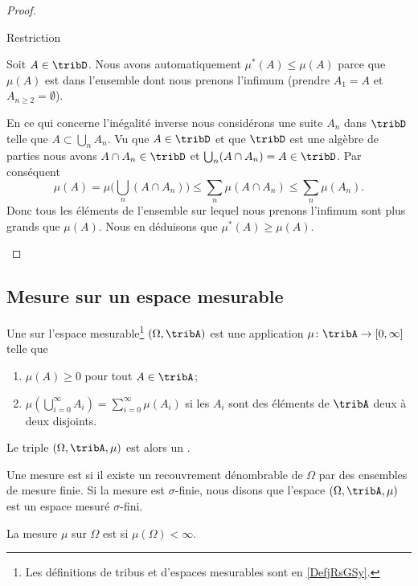 \begin{proof}
\begin{subproof}
    \item[Restriction]

        Soit \( A\in\tribD\). Nous avons automatiquement \( \mu^*(A)\leq \mu(A)\) parce que \( \mu(A)\) est dans l'ensemble dont nous prenons l'infimum (prendre \( A_1=A\) et \( A_{n\geq 2}=\emptyset\)).

        En ce qui concerne l'inégalité inverse nous considérons une suite \( A_n\) dans \( \tribD\) telle que \( A\subset\bigcup_nA_n\). Vu que \( A\in\tribD\) et que \( \tribD\) est une algèbre de parties nous avons \( A\cap A_n\in \tribD\) et \( \bigcup_n(A\cap A_n)=A\in\tribD\). Par conséquent
        \begin{equation}
            \mu(A)=\mu\big( \bigcup_n(A\cap A_n) \big)\leq \sum_n\mu(A\cap A_n)\leq \sum_n\mu(A_n).
        \end{equation}
        Donc tous les éléments de l'ensemble sur lequel nous prenons l'infimum sont plus grands que \( \mu(A)\). Nous en déduisons que \( \mu^*(A)\geq \mu(A)\).

    \end{subproof}
\end{proof}

\subsection{Mesure sur un espace mesurable}

\begin{definition}  \label{DefBTsgznn}
    Une  sur l'espace mesurable\footnote{Les définitions de tribus et d'espaces mesurables sont en \ref{DefjRsGSy}.} \( (\Omega,\tribA)\) est une application \( \mu\colon \tribA\to \mathopen[ 0 , \infty \mathclose]\) telle que
    \begin{enumerate}
        \item
            \( \mu(A)\geq 0\) pour tout \( A\in\tribA\);
        \item   \label{ItemQFjtOjXiii}
            \( \mu\left( \bigcup_{i=0}^{\infty}A_i\right)=\sum_{i=0}^{\infty}\mu(A_i)\) si les \( A_i\) sont des éléments de \( \tribA\) deux à deux disjoints. 
    \end{enumerate}
            Le triple \( (\Omega,\tribA,\mu)\) est alors un .

    Une mesure est  si il existe un recouvrement dénombrable de \( \Omega\) par des ensembles de mesure finie. Si la mesure est $\sigma$-finie, nous disons que l'espace \( (\Omega,\tribA,\mu)\) est un espace mesuré $\sigma$-fini.

    La mesure \( \mu\) sur \( \Omega\) est  si \( \mu(\Omega)<\infty\).
\end{definition}

